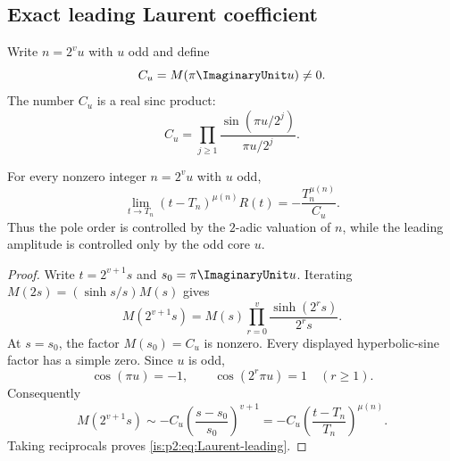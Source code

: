 \subsection{Exact leading Laurent coefficient}

Write $n=2^vu$ with $u$ odd and define
\begin{equation}
 C_u=M(\pi\ImaginaryUnit u)\ne0.
 \label{is:p2:eq:Cu}
\end{equation}
The number $C_u$ is a real sinc product:
\begin{equation}
 C_u=\prod_{j\ge1}\frac{\sin(\pi u/2^j)}{\pi u/2^j}.
 \label{is:p2:eq:Cu-product}
\end{equation}

\begin{theorem}
\label{is:p2:thm:Laurent-leading}
For every nonzero integer $n=2^vu$ with $u$ odd,
\begin{equation}
 \boxed{
 \lim_{t\to T_n}(t-T_n)^{\mu(n)}R(t)
 =-\frac{T_n^{\mu(n)}}{C_u}.
 }
 \label{is:p2:eq:Laurent-leading}
\end{equation}
Thus the pole order is controlled by the $2$-adic valuation of $n$, while the leading amplitude is
controlled only by the odd core $u$.
\end{theorem}

\begin{proof}
Write $t=2^{v+1}s$ and $s_0=\pi\ImaginaryUnit u$.  Iterating
$M(2s)=(\sinh s/s)M(s)$ gives
\begin{equation}
 M(2^{v+1}s)=M(s)\prod_{r=0}^{v}\frac{\sinh(2^rs)}{2^rs}.
 \label{is:p2:eq:M-iterate-pole}
\end{equation}
At $s=s_0$, the factor $M(s_0)=C_u$ is nonzero.  Every displayed hyperbolic-sine factor has a
simple zero.  Since $u$ is odd,
\begin{equation*}
 \cos(\pi u)=-1,
 \qquad
 \cos(2^r\pi u)=1\quad(r\ge1).
\end{equation*}
Consequently
\[
 M(2^{v+1}s)
 \sim -C_u\left(\frac{s-s_0}{s_0}\right)^{v+1}
 =-C_u\left(\frac{t-T_n}{T_n}\right)^{\mu(n)}.
\]
Taking reciprocals proves \eqref{is:p2:eq:Laurent-leading}.
\end{proof}

